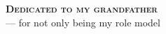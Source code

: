 
\thispagestyle{plain}

\vspace*{7cm}
\begin{flushright}
    \textbf{\Large \textsc{Dedicated to my grandfather}} \\[24pt]
        --- for not only being my role model%
\end{flushright}
